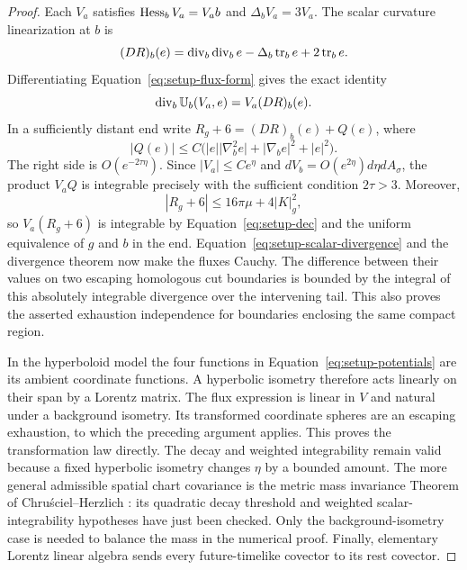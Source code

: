 \begin{proof}
Each $V_a$ satisfies $\operatorname{Hess}_bV_a=V_ab$ and $\Delta_bV_a=3V_a$.
The scalar curvature linearization at $b$ is
\[
 (DR)_b(e)=\operatorname{div}_b\operatorname{div}_be-\Delta_b\operatorname{tr}_be+2\operatorname{tr}_be.
\]
Differentiating Equation~\ref{eq:setup-flux-form} gives the exact identity
\begin{equation}\label{eq:setup-scalar-divergence}
 \operatorname{div}_b\mathbb U_b(V_a,e)=V_a(DR)_b(e).
\end{equation}
In a sufficiently distant end write
$R_g+6=(DR)_b(e)+Q(e)$, where
\[
 \lvert Q(e)\rvert
 \le C\bigl(\lvert e\rvert\lvert\nabla_b^2e\rvert
                +\lvert\nabla_be\rvert^2+\lvert e\rvert^2\bigr).
\]
The right side is $O(e^{-2\tau\eta})$. Since
$|V_a|\le C e^\eta$ and $dV_b=O(e^{2\eta})d\eta dA_\sigma$,
the product $V_aQ$ is integrable precisely with the sufficient condition
$2\tau>3$. Moreover,
\[
 |R_g+6|\le16\pi\mu+4|K|_g^2,
\]
so $V_a(R_g+6)$ is integrable by Equation~\ref{eq:setup-dec} and the
uniform equivalence of $g$ and $b$ in the end. Equation~\ref{eq:setup-scalar-divergence}
and the divergence theorem now make the fluxes Cauchy. The difference
between their values on two escaping homologous cut boundaries is
bounded by the integral of this absolutely integrable divergence over
the intervening tail. This also proves the asserted exhaustion
independence for boundaries enclosing the same compact region.

In the hyperboloid model the four functions in
Equation~\ref{eq:setup-potentials} are its ambient coordinate functions.
A hyperbolic isometry therefore acts linearly on their span by a Lorentz
matrix. The flux expression is linear in $V$ and natural under a
background isometry. Its transformed coordinate spheres are an escaping
exhaustion, to which the preceding argument applies. This proves the
transformation law directly. The decay and weighted integrability remain
valid because a fixed hyperbolic isometry changes $\eta$ by a bounded
amount. The more general admissible spatial chart covariance is the
metric mass invariance Theorem of Chru\'sciel--Herzlich
\cite[Proposition~2.2 and Theorem~2.3]{chruscielherzlich2003}: its quadratic
decay threshold and weighted scalar-integrability hypotheses have just
been checked. Only the background-isometry case is needed to balance
the mass in the numerical proof. Finally, elementary Lorentz linear
algebra sends every future-timelike covector to its rest covector.
\end{proof}

